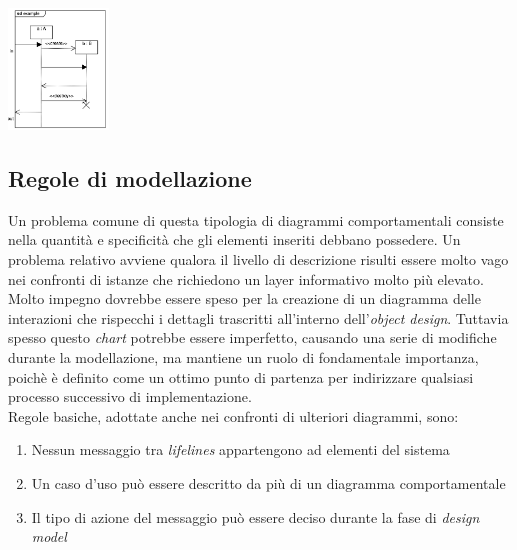 \documentclass{article}
\begin{document}
\begin{enumerate}
\begin{enumerate}[label={ }]
                                \begin{center}
                                    \includegraphics[width=0.2\textwidth]{foto 10.png}
                                \end{center}
                            \end{enumerate}
\end{enumerate}
\subsection*{Regole di modellazione}
\large
Un problema comune di questa tipologia di diagrammi comportamentali consiste nella quantità e specificità che gli elementi inseriti debbano possedere. Un problema relativo avviene qualora il livello di descrizione risulti essere molto vago nei confronti di istanze che richiedono un layer informativo molto più elevato.\\
Molto impegno dovrebbe essere speso per la creazione di un diagramma delle interazioni che rispecchi i dettagli trascritti all'interno dell'\textit{object design}. Tuttavia spesso questo \textit{chart} potrebbe essere imperfetto, causando una serie di modifiche durante la modellazione, ma mantiene un ruolo di fondamentale importanza, poichè è definito come un ottimo punto di partenza per indirizzare qualsiasi processo successivo di implementazione.\vspace*{14pt}\\
Regole basiche, adottate anche nei confronti di ulteriori diagrammi, sono:
\begin{enumerate}
    \renewcommand{\labelenumi}{-}
    \item Nessun messaggio tra \textit{lifelines} appartengono ad elementi del sistema
    \item Un caso d'uso può essere descritto da più di un diagramma comportamentale
    \item Il tipo di azione del messaggio può essere deciso durante la fase di \textit{design model}
\end{enumerate}
\end{document}
